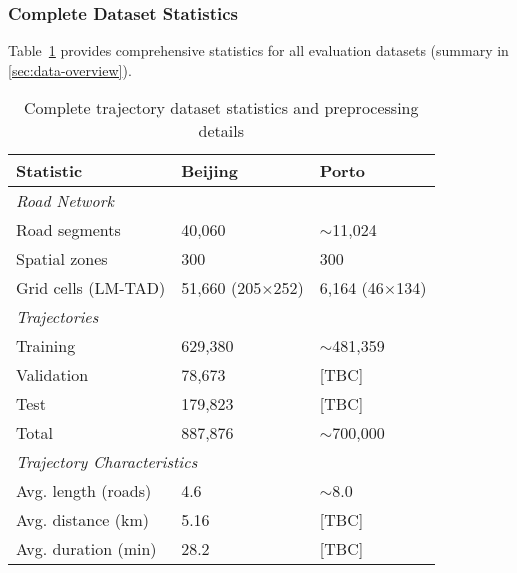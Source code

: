 \subsubsection{Complete Dataset Statistics}
\label{app:dataset-stats}

Table~\ref{tab:dataset-stats-appendix} provides comprehensive statistics for all evaluation datasets (summary in \autoref{sec:data-overview}).

\begin{table}[H]
    \centering
    \caption{Complete trajectory dataset statistics and preprocessing details}
    \label{tab:dataset-stats-appendix}
    \small
    \begin{tabular}{lll}
        \toprule
        \textbf{Statistic}              & \textbf{Beijing}        & \textbf{Porto}        \\
        \midrule
        \multicolumn{3}{l}{\textit{Road Network}}                                    \\
        \quad Road segments             & 40,060                  & $\sim$11,024          \\
        \quad Spatial zones             & 300                     & 300                   \\
        \quad Grid cells (LM-TAD)       & 51,660 (205$\times$252) & 6,164 (46$\times$134) \\
        \midrule
        \multicolumn{3}{l}{\textit{Trajectories}}                                    \\
        \quad Training                  & 629,380                 & $\sim$481,359         \\
        \quad Validation                & 78,673                  & [TBC]                 \\
        \quad Test                      & 179,823                 & [TBC]                 \\
        \quad Total                     & 887,876                 & $\sim$700,000         \\
        \midrule
        \multicolumn{3}{l}{\textit{Trajectory Characteristics}}                      \\
        \quad Avg. length (roads)       & 4.6                     & $\sim$8.0             \\
        \quad Avg. distance (km)        & 5.16                    & [TBC]                 \\
        \quad Avg. duration (min)       & 28.2                    & [TBC]                 \\

\end{tabular}
\end{table}
